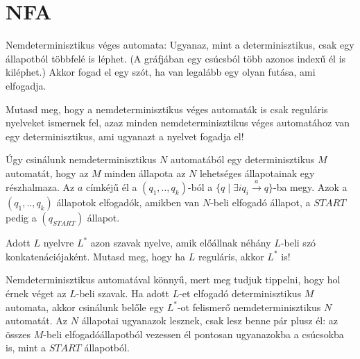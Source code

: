 \section{NFA}

 Nemdeterminisztikus véges automata: Ugyanaz, mint a determinisztikus, csak egy állapotból többfelé is léphet. (A gráfjában egy csúcsból több azonos indexű él is kiléphet.) Akkor fogad el egy szót, ha van legalább egy olyan futása, ami elfogadja.

\begin{Exercise}[counter={sorszam}, difficulty=0]
	Mutasd meg, hogy a nemdeterminisztikus v\'eges automaták is csak reguláris nyelveket ismernek fel, azaz minden nemdeterminisztikus véges automatához van egy determinisztikus, ami ugyanazt a nyelvet fogadja el!
\end{Exercise}	
\begin{Answer}
	\'Ugy csin\'alunk nemdeterminisztikus $N$ automat\'ab\'ol egy determinisztikus $M$ automat\'at, hogy az $M$ minden \'allapota az $N$ lehets\'eges \'allapotainak egy r\'eszhalmaza. Az $a$ c\'imk\'ej\H u \'el a $(q_1,..,q_k)$-b\'ol
	a $\{q\mid \exists i q_i \stackrel a\to q\}$-ba megy.
	Azok a $(q_1,..,q_k)$ \'allapotok elfogad\'ok, amikben van $N$-beli elfogad\'o \'allapot, a $START$ pedig a $(q_{START})$ \'allapot.
\end{Answer}

\begin{Exercise}[counter={sorszam}, difficulty=0]
	Adott $L$ nyelvre $L^*$ azon szavak nyelve, amik előállnak néhány $L$-beli szó konkatenációjaként. Mutasd meg, hogy ha $L$ reguláris, akkor $L^*$ is!
\end{Exercise}	
\begin{Answer}
	Nemdeterminisztikus automat\'aval k\"onny\H u, mert meg tudjuk tippelni, hogy hol \'ernek v\'eget az $L$-beli szavak.
	Ha adott $L$-et elfogad\'o determinisztikus $M$ automata, akkor csin\'alunk bel\H ole egy $L^*$-ot felismer\H o nemdeterminisztikus $N$ automat\'at. Az $N$ \'allapotai ugyanazok lesznek, csak lesz benne p\'ar plusz \'el: az \"osszes $M$-beli elfogad\'o\'allapotb\'ol vezessen \'el pontosan ugyanazokba a cs\'ucsokba is, mint a $START$ \'allapotb\'ol.
\end{Answer}


